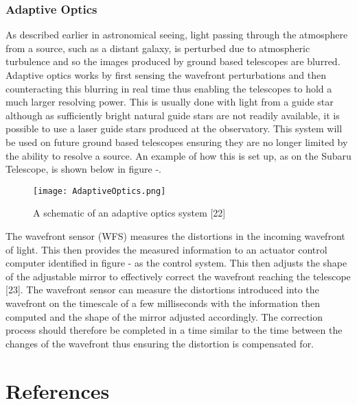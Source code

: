\documentclass[pdf,color]{UoBnote}
\begin{document}
\subsubsection{Adaptive Optics}
As described earlier in astronomical seeing, light passing through the atmosphere from a source, such as a distant galaxy, is perturbed due to atmospheric turbulence and so the images produced by ground based telescopes are blurred. Adaptive optics works by first sensing the wavefront perturbations and then counteracting this blurring in real time thus enabling the telescopes to hold a much larger resolving power. This is usually done with light from a guide star although as sufficiently bright natural guide stars are not readily available, it is possible to use a laser guide stars produced at the observatory. This system will be used on future ground based telescopes ensuring they are no longer limited by the ability to resolve a source. An example of how this is set up, as on the Subaru Telescope, is shown below in figure -. \\
\newline
\newline
\begin{figure}[H]
\begin{center}
\texttt{[image: AdaptiveOptics.png]}
\end{center}
\caption{A schematic of an adaptive optics system [22]}\label{fig:figure1}
\end{figure}
\noindent
The wavefront sensor (WFS) measures the distortions in the incoming wavefront of light. This then provides the measured information to an actuator control computer identified in figure - as the control system. This then adjusts the shape of the adjustable mirror to effectively correct the wavefront reaching the telescope [23].  The wavefront sensor can measure the distortions introduced into the wavefront on the timescale of a few milliseconds with the information then computed and the shape of the mirror adjusted accordingly. The correction process should therefore be completed in a time similar to the time between the changes of the wavefront thus ensuring the distortion is compensated for.\\

\section{References}
\end{document}
